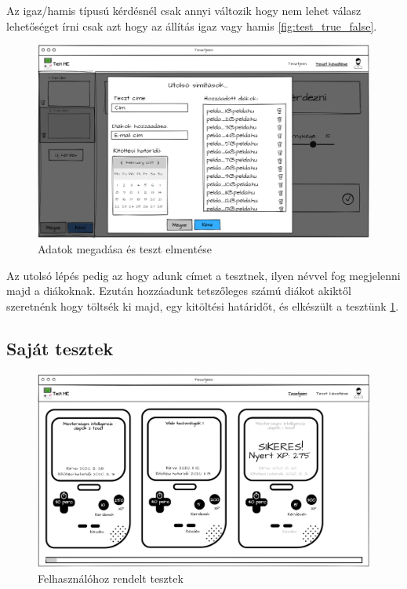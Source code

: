 Az igaz/hamis típusú kérdésnél csak annyi változik hogy nem lehet válasz lehetőséget írni csak azt hogy az állítás igaz vagy hamis \ref{fig:test_true_false}.

\begin{figure}[H]
    \centering
    \includegraphics[width=\linewidth]{images/make_test4_wireframe.png}
    \caption{Adatok megadása és teszt elmentése}
    \label{fig:save_test}
\end{figure}

Az utolsó lépés pedig az hogy adunk címet a tesztnek, ilyen névvel fog megjelenni majd a diákoknak. Ezután hozzáadunk tetszőleges számú diákot akiktől szeretnénk hogy töltsék ki majd, egy kitöltési határidőt, és elkészült a tesztünk \ref{fig:save_test}.

\subsection{Saját tesztek}
\begin{figure}[H]
    \centering
    \includegraphics[width=\linewidth]{images/my_tests_wireframe.png}
    \caption{Felhasználóhoz rendelt tesztek}
    \label{fig:my_tests}
\end{figure}

